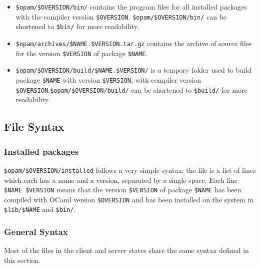 \documentclass[a4paper,11pt]{article}
\begin{document}
\begin{itemize}
\item \verb+$opam/$OVERSION/bin/+ contains the program files for all
  installed packages with the compiler version
  \verb+$OVERSION+. \verb+$opam/$OVERSION/bin/+ can be shortened to
  \verb+$bin/+ for more readability.

\item \verb+$opam/archives/$NAME.$VERSION.tar.gz+ contains the archive
  of source files for the version \verb+$VERSION+ of package
  \verb+$NAME+.

\item \verb+$opam/$OVERSION/build/$NAME.$VERSION/+ is a tempory folder
  used to build package \verb+$NAME+ with version \verb+$VERSION+,
  with compiler version \verb+$OVERSION+.\verb+$opam/$OVERSION/build/+
  can be shortened to \verb+$build/+ for more readability.

\end{itemize}

\subsection{File Syntax}

\subsubsection{Installed packages}
\label{installed}

\verb+$opam/$OVERSION/installed+ follows a very simple syntax: the
file is a list of lines which each has a name and a version, separated
by a single space. Each line \verb+$NAME $VERSION+ means that the
version \verb+$VERSION+ of package \verb+$NAME+ has been compiled with
OCaml version \verb+$OVERSION+ and has been installed on the system in
\verb+$lib/$NAME+ and \verb+$bin/+.

\subsubsection{General Syntax}
\label{syntax}

Most of the files in the client and server states share the same
syntax defined in this section.
\end{document}

